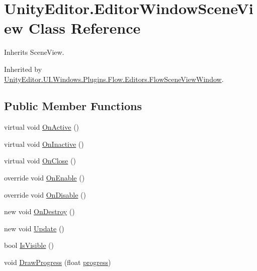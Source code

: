 \hypertarget{class_unity_editor_1_1_editor_window_scene_view}{}\section{Unity\+Editor.\+Editor\+Window\+Scene\+View Class Reference}
\label{class_unity_editor_1_1_editor_window_scene_view}


Inherits Scene\+View.



Inherited by \hyperlink{class_unity_editor_1_1_u_i_1_1_windows_1_1_plugins_1_1_flow_1_1_editors_1_1_flow_scene_view_window}{Unity\+Editor.\+U\+I.\+Windows.\+Plugins.\+Flow.\+Editors.\+Flow\+Scene\+View\+Window}.

\subsection*{Public Member Functions}
\begin{DoxyCompactItemize}
\item 
virtual void \hyperlink{class_unity_editor_1_1_editor_window_scene_view_af8ac8b78b5c12ed09068d9f1b1e07d39}{On\+Active} ()
\item 
virtual void \hyperlink{class_unity_editor_1_1_editor_window_scene_view_a5cd019726251383e1391543f5be7864f}{On\+Inactive} ()
\item 
virtual void \hyperlink{class_unity_editor_1_1_editor_window_scene_view_a80474735a103b692e0677e9a0316c6ba}{On\+Close} ()
\item 
override void \hyperlink{class_unity_editor_1_1_editor_window_scene_view_aebe2ad6cb39f995bb96a4abe14504f20}{On\+Enable} ()
\item 
override void \hyperlink{class_unity_editor_1_1_editor_window_scene_view_af18b05f3eaa02f4a6dce5b2e9166c40c}{On\+Disable} ()
\item 
new void \hyperlink{class_unity_editor_1_1_editor_window_scene_view_a3f3aa61554123ed516cb7a5872021d06}{On\+Destroy} ()
\item 
new void \hyperlink{class_unity_editor_1_1_editor_window_scene_view_a07841378f2729ec083927999275c0309}{Update} ()
\item 
bool \hyperlink{class_unity_editor_1_1_editor_window_scene_view_abbc6596b057748360f5a378374cf8f36}{Is\+Visible} ()
\item 
void \hyperlink{class_unity_editor_1_1_editor_window_scene_view_a4a3ba8dec3653653cb8c381200ecd646}{Draw\+Progress} (float \hyperlink{class_unity_editor_1_1_editor_window_scene_view_ac23a4737866653a41e680de245a58eff}{progress})
\end{DoxyCompactItemize}
